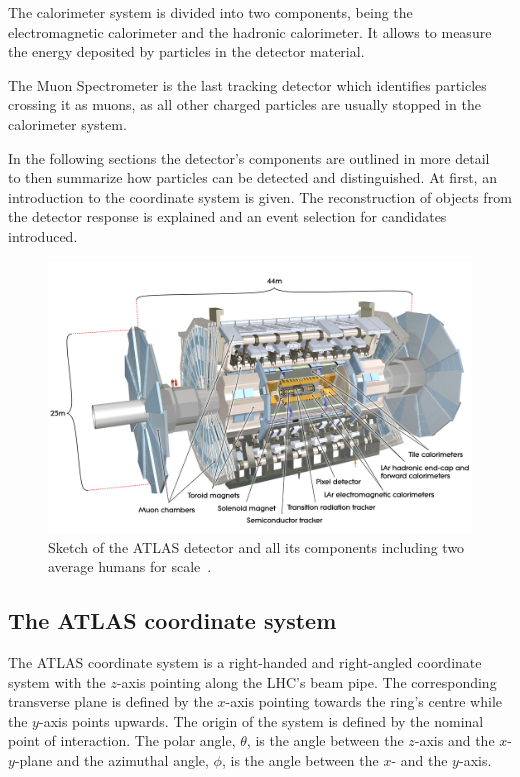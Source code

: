 The calorimeter system is divided into two components, being the electromagnetic calorimeter and the hadronic calorimeter. It allows to measure the energy deposited by particles in the detector material.

The Muon Spectrometer is the last tracking detector which identifies particles crossing it as muons, as all other charged particles are usually stopped in the calorimeter system.

In the following sections the detector's components are outlined in more detail~\cite{wermes} to then summarize how particles can be detected and distinguished. At first, an introduction to the coordinate system is given. The reconstruction of objects from the detector response is explained and an event selection for \tW candidates introduced.



\begin{figure}[htbp]
  \centering
  \includegraphics[scale=0.15]{figures_LHC/atlas-detector}
  \caption[Sketch of the ATLAS detector]{Sketch of the ATLAS detector and all its components including two average humans for scale~\cite{Pequenao:1095924}.}
  \label{fig:atlas}
\end{figure}

\subsection{The ATLAS coordinate system}

The ATLAS coordinate system is a right-handed and right-angled coordinate system with the $z$-axis pointing along the LHC's beam pipe. The corresponding transverse plane is defined by the $x$-axis pointing towards the ring's centre while the $y$-axis points upwards. The origin of the system is defined by the nominal point of interaction. The polar angle, $\theta$, is the angle between the $z$-axis and the $x$-$y$-plane and the azimuthal angle, $\phi$, is the angle between the $x$- and the $y$-axis.

